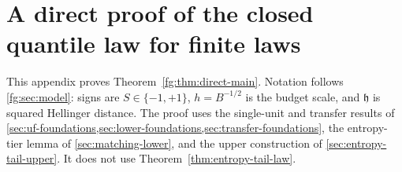\section{A direct proof of the closed quantile law for finite laws}\label{app:finite-direct}
This appendix proves Theorem~\ref{fg:thm:direct-main}. Notation follows
\cref{fg:sec:model}: signs are $S\in\{-1,+1\}$, $h=B^{-1/2}$ is the
budget scale, and $\mathfrak h$ is squared Hellinger distance. The proof
uses the single-unit and transfer results of
\cref{sec:uf-foundations,sec:lower-foundations,sec:transfer-foundations},
the entropy-tier lemma of \cref{sec:matching-lower}, and the upper
construction of \cref{sec:entropy-tail-upper}. It does not use
Theorem~\ref{thm:entropy-tail-law}.




